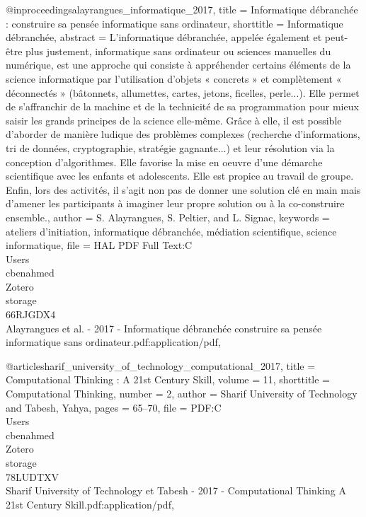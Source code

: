 @inproceedings{alayrangues_informatique_2017,
	title = {Informatique débranchée : construire sa pensée informatique sans ordinateur},
	shorttitle = {Informatique débranchée},
	abstract = {L'informatique débranchée, appelée également et peut-être plus justement, informatique sans ordinateur ou 
sciences manuelles du numérique, est une approche qui consiste à appréhender certains éléments de la science informatique par 
l'utilisation d'objets « concrets » et complètement « déconnectés » (bâtonnets, allumettes, cartes, jetons, ficelles, perle...). 
Elle permet de s'affranchir de la machine et de la technicité de sa programmation pour mieux saisir les grands principes de la 
science elle-même. Grâce à elle, il est possible d'aborder de manière ludique des problèmes complexes (recherche d'informations, 
tri de données, cryptographie, stratégie gagnante...) et leur résolution via la conception d'algorithmes. Elle favorise la mise 
en oeuvre d'une démarche scientifique avec les enfants et adolescents. Elle est propice au travail de groupe. Enfin, lors des 
activités, il s'agit non pas de donner une solution clé en main mais d'amener les participants à imaginer leur propre solution 
ou à la co-construire ensemble.},
	author = {S. Alayrangues, S. Peltier, and L. Signac},
	keywords = {ateliers d'initiation, informatique débranchée, médiation scientifique, science informatique},
	file = {HAL PDF Full Text:C\:\\Users\\cbenahmed\\Zotero\\storage\\66RJGDX4\\Alayrangues et al. - 2017 - Informatique 
débranchée  construire sa pensée informatique sans ordinateur.pdf:application/pdf},
}

@article{sharif_university_of_technology_computational_2017,
	title = {Computational Thinking : A 21st Century Skill},
	volume = {11},
	shorttitle = {Computational Thinking},
	number = {2},
	author = {{Sharif University of Technology} and Tabesh, Yahya},
	pages = {65--70},
	file = {PDF:C\:\\Users\\cbenahmed\\Zotero\\storage\\78LUDTXV\\Sharif University of Technology et Tabesh - 2017 - 
Computational Thinking A 21st Century Skill.pdf:application/pdf},
}

